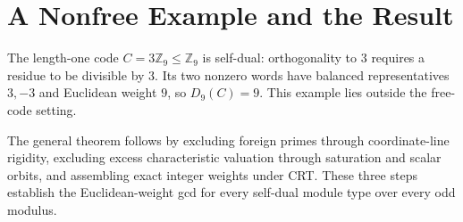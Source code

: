 \documentclass[12pt,letterpaper,onecolumn]{article}
\newcommand{\Z}{\mathbb{Z}}
\begin{document}
\section{A Nonfree Example and the Result}
The length-one code $C=3\Z_9\le\Z_9$ is self-dual: orthogonality to $3$ requires a residue to be divisible by $3$. Its two nonzero words have balanced representatives $3,-3$ and Euclidean weight $9$, so $D_9(C)=9$. This example lies outside the free-code setting.

The general theorem follows by excluding foreign primes through coordinate-line rigidity, excluding excess characteristic valuation through saturation and scalar orbits, and assembling exact integer weights under CRT. These three steps establish the Euclidean-weight gcd for every self-dual module type over every odd modulus.
\end{document}
